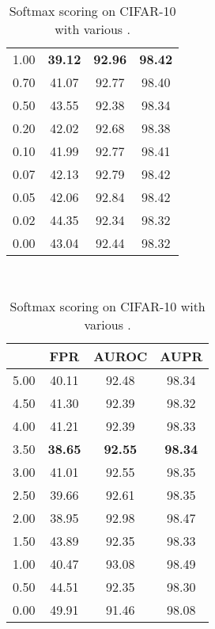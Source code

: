 \documentclass{article}
\begin{document}
\begin{table}[t]
{{\begin{tabular}{c|ccc}
\cellcolor{greyC}1.00               & \cellcolor{greyC}\textbf{39.12}                  & \cellcolor{greyC}\textbf{92.96}                  & \cellcolor{greyC}\textbf{98.42}       \\
0.70               & 41.07                  & 92.77                  & 98.40       \\
0.50               & 43.55                  & 92.38                  & 98.34       \\ 
0.20               & 42.02                  & 92.68                  & 98.38       \\
0.10               & 41.99                  & 92.77                  & 98.41       \\
0.07               & 42.13                  & 92.79                  & 98.42       \\
0.05               & 42.06                  & 92.84                  & 98.42       \\ 
0.02               & 44.35                  & 92.34                  & 98.32       \\
0.00               & 43.04                  & 92.44                  & 98.32       \\
\bottomrule[1.5pt]      
\end{tabular}
}
}~~
\parbox{.30\linewidth}{
\centering
\caption{Softmax scoring on CIFAR-10 with various .} \label{tab: ablation beta full cifar10}
\scriptsize
\vspace{5pt}
{
\begin{tabular}{c|ccc}
\toprule[1.5pt]
             & FPR     & AUROC       & AUPR     \\
\midrule[0.6pt]
5.00               & 40.11                  & 92.48                  & 98.34 \\
4.50               & 41.30                  & 92.39                  & 98.32 \\
4.00               & 41.21                  & 92.39                  & 98.33 \\
\cellcolor{greyC}3.50               & \cellcolor{greyC}\textbf{38.65}                  & \cellcolor{greyC}\textbf{92.55}                  & \cellcolor{greyC}\textbf{98.34}      \\
3.00               & 41.01                  & 92.55                  & 98.35 \\
2.50               & 39.66                  & 92.61                  & 98.35 \\
2.00               & 38.95                  & 92.98                  & 98.47 \\
1.50               & 43.89                  & 92.35                  & 98.33 \\
1.00               & 40.47                  & 93.08                  & 98.49 \\
0.50               & 44.51                  & 92.35                  & 98.30 \\
0.00               & 49.91                  & 91.46                  & 98.08 \\
\bottomrule[1.5pt]      
\end{tabular}
}
}
\end{table}
\end{document}
